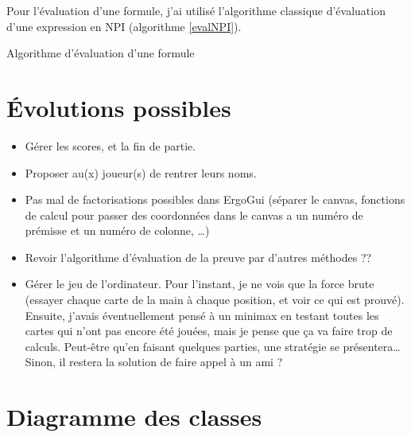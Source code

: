 \documentclass[12pt, algo]{cours}
\begin{document}
Pour l'évaluation d'une formule, j'ai utilisé l'algorithme classique d'évaluation d'une expression en NPI (algorithme \ref{evalNPI}).

\begin{algorithm}
\caption{Algorithme d'évaluation d'une formule}
\label{evalNPI}
\end{algorithm}

\section{Évolutions possibles}

\begin{itemize}
\item Gérer les scores, et la fin de partie.
\item Proposer au(x) joueur(s) de rentrer leurs noms.
\item Pas mal de factorisations possibles dans ErgoGui (séparer le canvas, fonctions de calcul pour passer des coordonnées dans le canvas a un numéro de prémisse et un numéro de colonne, \dots)
\item Revoir l'algorithme d'évaluation de la preuve par d'autres méthodes ??
\item Gérer le jeu de l'ordinateur.  Pour l'instant, je ne vois que la force brute (essayer chaque carte de la main à chaque position, et voir ce qui est prouvé). Ensuite, j'avais éventuellement pensé à un minimax en testant toutes les cartes qui n'ont pas encore été jouées, mais je pense que ça va faire trop de calculs. Peut-être qu'en faisant quelques parties, une stratégie se présentera\dots Sinon, il restera la solution de faire appel à un ami ?
\end{itemize}

\appendix

\section{Diagramme des classes}


\end{document}
